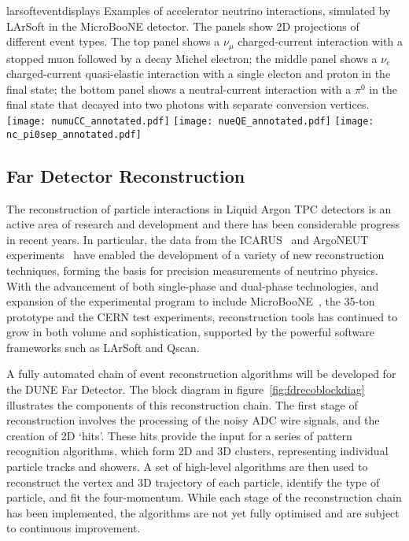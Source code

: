 \begin{cdrfigure}{larsofteventdisplays}
{Examples of accelerator neutrino interactions, simulated by LArSoft in the 
MicroBooNE detector. The panels show 2D projections of different event types.
The top panel shows a $\nu_{\mu}$ charged-current interaction with a stopped muon followed
by a decay Michel electron; the middle panel shows a $\nu_{e}$ charged-current 
quasi-elastic interaction with a single electon and proton in the final state;
the bottom panel shows a neutral-current interaction with a $\pi^{0}$ in the final state
that decayed into two photons with separate conversion vertices.}
\texttt{[image: numuCC\_annotated.pdf]}
\texttt{[image: nueQE\_annotated.pdf]}
\texttt{[image: nc\_pi0sep\_annotated.pdf]}
\end{cdrfigure}


\subsection{Far Detector Reconstruction}
\label{sec:detectors-sc-physics-software-reconstruction-fd}

The reconstruction of particle interactions in Liquid Argon TPC
detectors is an active area of research and development and
there has been considerable progress in recent years. 
In particular, the data from the ICARUS~\cite{Amerio:2004ze,icarus-url,ICARUS-pizero,Antonello:2012hu} 
and ArgoNEUT experiments~\cite{Adamson:2013/02/28tla,argoneut-url,Acciarri:2013met}
have enabled the development of a variety of new reconstruction techniques,
forming the basis for precision measurements of neutrino physics.
With the advancement of both single-phase and dual-phase technologies,
and expansion of the experimental program to include MicroBooNE~\cite{Chen:2007ae,microboone-url},
the 35-ton prototype and the CERN test experiments,
reconstruction tools has continued to grow in both volume and sophistication,
supported by the powerful software frameworks such as LArSoft and Qscan.

A fully automated chain of event reconstruction algorithms
will be developed for the DUNE Far Detector.
The block diagram in figure~\ref{fig:fdrecoblockdiag} illustrates 
the components of this reconstruction chain.
The first stage of reconstruction involves the processing of the
noisy ADC wire signals, and the creation of 2D `hits'. 
These hits provide the input for a series of pattern recognition algorithms,
which form 2D and 3D clusters, representing individual particle tracks and showers.
A set of high-level algorithms are then used to reconstruct the vertex
and 3D trajectory of each particle, identify the type of particle,
and fit the four-momentum.
While each stage of the reconstruction chain has been implemented,
the algorithms are not yet fully optimised and are subject to
continuous improvement.

